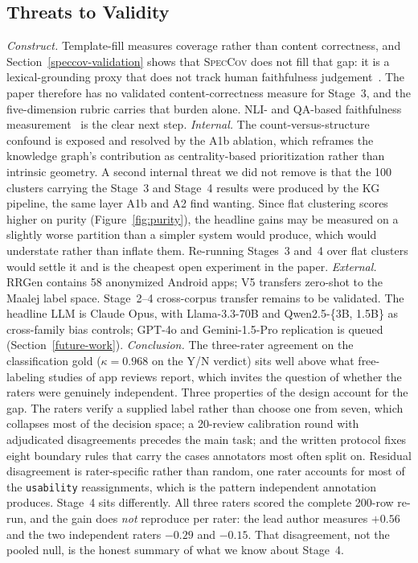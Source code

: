 \documentclass[sigconf, anonymous]{acmart}
\begin{document}
\subsection{Threats to Validity}
\emph{Construct.} Template-fill measures coverage rather than content correctness, and Section~\ref{speccov-validation} shows that \textsc{SpecCov} does not fill that gap: it is a lexical-grounding proxy that does not track human faithfulness judgement~\cite{grusky2018newsroom, maynez2020faithfulness, kryscinski2020evaluating, ji2023survey}. The paper therefore has no validated content-correctness measure for Stage~3, and the five-dimension rubric carries that burden alone. NLI- and QA-based faithfulness measurement~\cite{laban2022summac, honovich2022true, durmus2020feqa} is the clear next step.
\emph{Internal.} The count-versus-structure confound is exposed and resolved by the A1b ablation, which reframes the knowledge graph's contribution as centrality-based prioritization rather than intrinsic geometry. A second internal threat we did not remove is that the 100 clusters carrying the Stage~3 and Stage~4 results were produced by the KG pipeline, the same layer A1b and A2 find wanting. Since flat clustering scores higher on purity (Figure~\ref{fig:purity}), the headline gains may be measured on a slightly worse partition than a simpler system would produce, which would understate rather than inflate them. Re-running Stages~3 and~4 over flat clusters would settle it and is the cheapest open experiment in the paper.
\emph{External.} RRGen contains 58 anonymized Android apps; V5 transfers zero-shot to the Maalej label space. Stage~2--4 cross-corpus transfer remains to be validated. The headline LLM is Claude Opus, with Llama-3.3-70B and Qwen2.5-\{3B, 1.5B\} as cross-family bias controls; GPT-4o and Gemini-1.5-Pro replication is queued (Section~\ref{future-work}).
\emph{Conclusion.} The three-rater agreement on the classification gold ($\kappa = 0.968$ on the Y/N verdict) sits well above what free-labeling studies of app reviews report, which invites the question of whether the raters were genuinely independent. Three properties of the design account for the gap. The raters verify a supplied label rather than choose one from seven, which collapses most of the decision space; a 20-review calibration round with adjudicated disagreements precedes the main task; and the written protocol fixes eight boundary rules that carry the cases annotators most often split on. Residual disagreement is rater-specific rather than random, one rater accounts for most of the \texttt{usability} reassignments, which is the pattern independent annotation produces. Stage~4 sits differently. All three raters scored the complete 200-row re-run, and the gain does \emph{not} reproduce per rater: the lead author measures $+0.56$ and the two independent raters $-0.29$ and $-0.15$. That disagreement, not the pooled null, is the honest summary of what we know about Stage~4.
\end{document}
